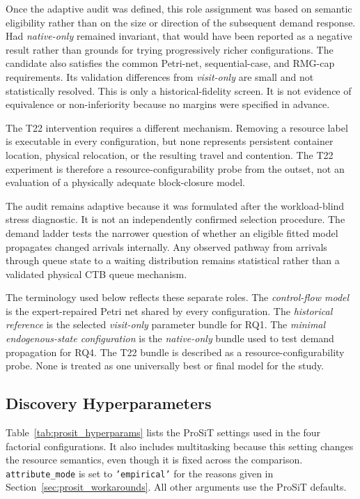 Once the adaptive audit was defined, this role assignment was based on semantic
eligibility rather than on the size or direction of the subsequent demand
response. Had \textit{native-only} remained invariant, that would have been
reported as a negative result rather than grounds for trying progressively
richer configurations. The candidate also satisfies the common Petri-net,
sequential-case, and RMG-cap requirements. Its validation differences from
\textit{visit-only} are small and not statistically resolved. This is only a
historical-fidelity screen. It is not evidence of equivalence or
non-inferiority because no margins were specified in advance.

The T22 intervention requires a different mechanism. Removing a resource label
is executable in every configuration, but none represents persistent container
location, physical relocation, or the resulting travel and contention. The T22
experiment is therefore a resource-configurability probe from the outset, not
an evaluation of a physically adequate block-closure model.

The audit remains adaptive because it was formulated after the workload-blind
stress diagnostic. It is not an independently confirmed selection procedure.
The demand ladder tests the narrower question of whether an eligible fitted
model propagates changed arrivals internally. Any observed pathway from
arrivals through queue state to a waiting distribution remains statistical
rather than a validated physical CTB queue mechanism.

The terminology used below reflects these separate roles. The
\emph{control-flow model} is the expert-repaired Petri net shared by every
configuration. The \emph{historical reference} is the selected
\textit{visit-only} parameter bundle for RQ1. The \emph{minimal endogenous-state
configuration} is the \textit{native-only} bundle used to test demand
propagation for RQ4. The T22 bundle is described as a resource-configurability
probe. None is treated as one universally best or final model for the study.

\subsection{Discovery Hyperparameters}

Table~\ref{tab:prosit_hyperparams} lists the ProSiT settings used in the four
factorial configurations. It also includes multitasking because this setting changes the
resource semantics, even though it is fixed across the comparison.
\texttt{attribute\_mode} is set to \texttt{'empirical'} for the reasons given
in Section~\ref{sec:prosit_workarounds}. All other arguments use the ProSiT
defaults.

